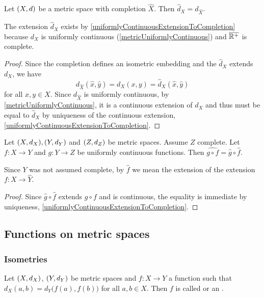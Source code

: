 \begin{lemma}
Let $\sSet{X,d}$ be a metric space with completion $\hat{X}$. Then $\hat{d}_X = d_{\hat{X}}$.
\end{lemma}
The extension $\hat{d}_X$ exists by \ref{uniformlyContinuousExtensionToCompletion} because $d_X$ is uniformly continuous (\ref{metricUniformlyContinuous}) and $\overline{\mathbb{R}^+}$ is complete.
\begin{proof}
Since the completion defines an isometric embedding and the $\hat{d}_X$ extends $d_X$, we have
\[ d_{\hat{X}}(\hat{x}, \hat{y}) = d_X(x,y) = \hat{d}_X(\hat{x}, \hat{y}) \]
for all $x,y\in X$. Since $d_{\hat{X}}$ is uniformly continuous, by \ref{metricUniformlyContinuous}, it is a continuous extension of $d_X$ and thus must be equal to $\hat{d}_X$ by uniqueness of the continuous extension, \ref{uniformlyContinuousExtensionToCompletion}.  
\end{proof}
\begin{lemma}
Let $\sSet{X,d_X}, \sSet{Y,d_Y}$ and $\sSet{Z,d_Z}$ be metric spaces. Assume $Z$ complete. Let $f: X\to Y$ and $g: Y\to Z$ be uniformly continuous functions. Then $\widehat{g\circ f} = \hat{g}\circ \hat{f}$.
\end{lemma}
Since $Y$ was not assumed complete, by $\hat{f}$ we mean the extension of the extension $f: X\to \hat{Y}$. 
\begin{proof}
Since $\hat{g}\circ \hat{f}$ extends $g\circ f$ and is continuous, the equality is immediate by uniqueness, \ref{uniformlyContinuousExtensionToCompletion}.
\end{proof}


\subsection{Functions on metric spaces}
\subsubsection{Isometries}
\begin{definition}
Let $\sSet{X,d_X}$, $\sSet{Y,d_Y}$ be metric spaces and $f: X\to Y$ a function such that $d_X(a,b) = d_Y\big(f(a), f(b)\big)$ for all $a,b\in X$. Then $f$ is called  or an .
\end{definition}


